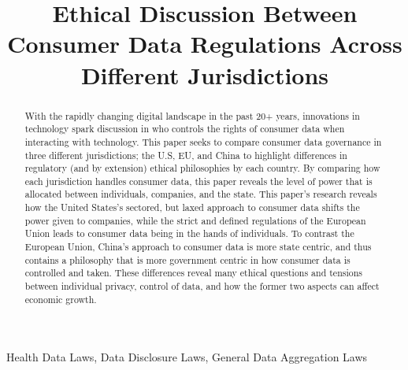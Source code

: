\documentclass[conference]{IEEEtran}
\begin{document}
\title{Ethical Discussion Between Consumer Data Regulations Across Different Jurisdictions\\
}

\author{
}

\maketitle
\thispagestyle{fancy}

\begin{abstract}
With the rapidly changing digital landscape in the past 20+ years, innovations
in technology spark discussion in who controls the rights of consumer data when
interacting with technology. This paper seeks to compare consumer data governance in three different jurisdictions; the U.S, EU, and China to highlight
differences in regulatory (and by extension) ethical philosophies by each country. By comparing how each jurisdiction handles consumer data, this paper
reveals the level of power that is allocated between individuals, companies, and
the state. This paper’s research reveals how the United States’s sectored, but
laxed approach to consumer data shifts the power given to companies, while the
strict and defined regulations of the European Union leads to consumer data
being in the hands of individuals. To contrast the European Union, China’s approach to consumer data is more state centric, and thus contains a philosophy
that is more government centric in how consumer data is controlled and taken.
These differences reveal many ethical questions and tensions between individual
privacy, control of data, and how the former two aspects can affect economic
growth.
\end{abstract}

\begin{IEEEkeywords}
Health Data Laws, Data Disclosure Laws, General Data Aggregation Laws
\end{IEEEkeywords}
\end{document}
